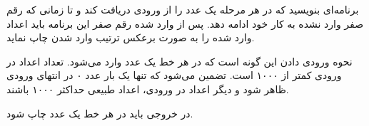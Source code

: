 \begin{problem}{}
{}{}
{}{}{}

برنامه‌ای بنویسید که در هر مرحله یک عدد را از ورودی دریافت کند و تا زمانی که رقم صفر وارد نشده به کار خود ادامه دهد. پس از وارد شده رقم صفر این برنامه باید اعداد وارد شده را به صورت برعکس ترتیب وارد شدن چاپ نماید.

\InputFile
نحوه ورودی دادن این گونه است که در هر خط یک عدد وارد می‌شود. تعداد اعداد در ورودی کمتر از ۱۰۰۰ است. تضمین می‌شود که تنها یک بار عدد ۰ در انتهای ورودی ظاهر شود و دیگر اعداد در ورودی، اعداد طبیعی حداکثر ۱۰۰۰ باشند.

\OutputFile

در خروجی باید در هر خط یک عدد چاپ شود.

\Examples

\begin{example}
%
\end{example}


\end{problem}

